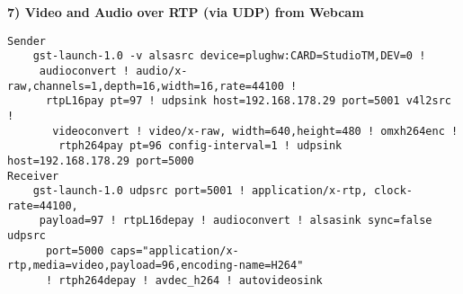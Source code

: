 \textbf{7) Video and Audio over RTP (via UDP) from Webcam}
\begin{verbatim}
Sender
    gst-launch-1.0 -v alsasrc device=plughw:CARD=StudioTM,DEV=0 !
     audioconvert ! audio/x-raw,channels=1,depth=16,width=16,rate=44100 !
      rtpL16pay pt=97 ! udpsink host=192.168.178.29 port=5001 v4l2src !
       videoconvert ! video/x-raw, width=640,height=480 ! omxh264enc !
        rtph264pay pt=96 config-interval=1 ! udpsink host=192.168.178.29 port=5000
Receiver
    gst-launch-1.0 udpsrc port=5001 ! application/x-rtp, clock-rate=44100,
     payload=97 ! rtpL16depay ! audioconvert ! alsasink sync=false udpsrc
      port=5000 caps="application/x-rtp,media=video,payload=96,encoding-name=H264" 
      ! rtph264depay ! avdec_h264 ! autovideosink
\end{verbatim}

